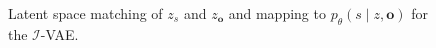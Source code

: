 \begin{figure}[t]
    \centering
    \caption{Latent space matching of $z_s$ and $z_\mathbf{o}$ and mapping to $p_\theta(s \mid z, \mathbf{o})$ for the $\mathcal{I}$-VAE.}
    \label{fig:mapping}
\end{figure}


